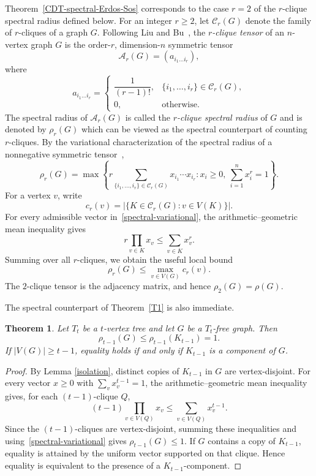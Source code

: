 \documentclass[11pt,a4paper]{article}
\newtheorem{theorem}{Theorem}[section]
\begin{document}
Theorem~\ref{CDT-spectral-Erdos-Sos} corresponds to the case $r=2$ of the $r$-clique spectral radius defined below. For an integer $r\ge2$, let $\mathcal C_r(G)$ denote the family of $r$-cliques of a graph $G$.
Following Liu and Bu~\cite{LiuBu2023}, the \emph{$r$-clique tensor} of an $n$-vertex graph $G$ is the order-$r$, dimension-$n$ symmetric tensor
\[
\mathcal A_r(G)=(a_{i_1\ldots i_r}),
\]
where
\[
a_{i_1\ldots i_r}=
\begin{cases}
\dfrac{1}{(r-1)!},& \{i_1,\ldots,i_r\}\in\mathcal C_r(G),\\[2mm]
0,&\text{otherwise}.
\end{cases}
\]
The spectral radius of $\mathcal A_r(G)$ is called the \emph{$r$-clique spectral radius} of $G$ and is denoted by $\rho_r(G)$  which can be viewed as the spectral  counterpart of counting $r$-cliques.
By the variational characterization of the spectral radius of a nonnegative symmetric tensor~\cite{Qi2013},
\begin{equation}\label{spectral-variational}
\rho_r(G)=
\max\left\{
 r\sum_{\{i_1,\ldots,i_r\}\in\mathcal C_r(G)}x_{i_1}\cdots x_{i_r}:
 x_i\ge0,\ \sum_{i=1}^n x_i^r=1
\right\}.
\end{equation}
For a vertex $v$, write
\[
c_r(v)=|\{K\in\mathcal C_r(G):v\in V(K)\}|.
\]
For every admissible vector in~\eqref{spectral-variational}, the arithmetic--geometric mean inequality gives
\[
r\prod_{v\in K}x_v\le \sum_{v\in K}x_v^r.
\]
Summing over all $r$-cliques, we obtain the useful local bound
\begin{equation}\label{local-clique-degree}
\rho_r(G)\le \max_{v\in V(G)}c_r(v).
\end{equation}
The $2$-clique tensor is the adjacency matrix, and hence $\rho_2(G)=\rho(G)$.

The spectral counterpart of Theorem~\ref{T1} is also immediate.

\begin{theorem}\label{spectral-T1}
Let $T_t$ be a $t$-vertex tree and let $G$ be a $T_t$-free graph. Then
\[
\rho_{t-1}(G)\le \rho_{t-1}(K_{t-1})=1.
\]
If $|V(G)|\ge t-1$, equality holds if and only if $K_{t-1}$ is a component of $G$.
\end{theorem}

\begin{proof}
By Lemma \ref{isolation},  distinct copies of $K_{t-1}$ in $G$ are vertex-disjoint. For every vector $x\ge0$ with $\sum_v x_v^{t-1}=1$, the arithmetic--geometric mean inequality gives, for each $(t-1)$-clique $Q$,
\[
(t-1)\prod_{v\in V(Q)}x_v\le \sum_{v\in V(Q)}x_v^{t-1}.
\]
Since the $(t-1)$-cliques are vertex-disjoint, summing these inequalities and using~\eqref{spectral-variational} gives $\rho_{t-1}(G)\le1$. If $G$ contains a copy of $K_{t-1}$, equality is attained by the uniform vector supported on that clique. Hence equality is equivalent to the presence of a $K_{t-1}$-component.
\end{proof}
\end{document}
